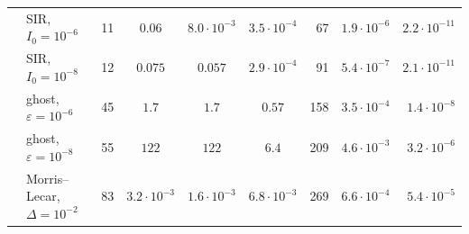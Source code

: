 \begin{tabular}{llrcccrcr}
 & SIR, $I_0=10^{-6}$ & 11 & $0.06$ & $8.0\cdot10^{-3}$ & $3.5\cdot10^{-4}$ & 67 & $1.9\cdot10^{-6}$ & $2.2\cdot10^{-11}$\\
 & SIR, $I_0=10^{-8}$ & 12 & $0.075$ & $0.057$ & $2.9\cdot10^{-4}$ & 91 & $5.4\cdot10^{-7}$ & $2.1\cdot10^{-11}$\\
 & ghost, $\varepsilon=10^{-6}$ & 45 & $1.7$ & $1.7$ & $0.57$ & 158 & $3.5\cdot10^{-4}$ & $1.4\cdot10^{-8}$\\
 & ghost, $\varepsilon=10^{-8}$ & 55 & $122$ & $122$ & $6.4$ & 209 & $4.6\cdot10^{-3}$ & $3.2\cdot10^{-6}$\\
 & Morris--Lecar, $\Delta=10^{-2}$ & 83 & $3.2\cdot10^{-3}$ & $1.6\cdot10^{-3}$ & $6.8\cdot10^{-3}$ & 269 & $6.6\cdot10^{-4}$ & $5.4\cdot10^{-5}$\\
\bottomrule
\end{tabular}
